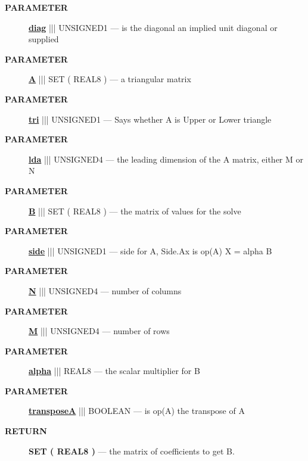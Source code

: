 \par
\begin{description}
\item [\colorbox{tagtype}{\color{white} \textbf{\textsf{PARAMETER}}}] \textbf{\underline{diag}} ||| UNSIGNED1 --- is the diagonal an implied unit diagonal or supplied
\item [\colorbox{tagtype}{\color{white} \textbf{\textsf{PARAMETER}}}] \textbf{\underline{A}} ||| SET ( REAL8 ) --- a triangular matrix
\item [\colorbox{tagtype}{\color{white} \textbf{\textsf{PARAMETER}}}] \textbf{\underline{tri}} ||| UNSIGNED1 --- Says whether A is Upper or Lower triangle
\item [\colorbox{tagtype}{\color{white} \textbf{\textsf{PARAMETER}}}] \textbf{\underline{lda}} ||| UNSIGNED4 --- the leading dimension of the A matrix, either M or N
\item [\colorbox{tagtype}{\color{white} \textbf{\textsf{PARAMETER}}}] \textbf{\underline{B}} ||| SET ( REAL8 ) --- the matrix of values for the solve
\item [\colorbox{tagtype}{\color{white} \textbf{\textsf{PARAMETER}}}] \textbf{\underline{side}} ||| UNSIGNED1 --- side for A, Side.Ax is op(A) X = alpha B
\item [\colorbox{tagtype}{\color{white} \textbf{\textsf{PARAMETER}}}] \textbf{\underline{N}} ||| UNSIGNED4 --- number of columns
\item [\colorbox{tagtype}{\color{white} \textbf{\textsf{PARAMETER}}}] \textbf{\underline{M}} ||| UNSIGNED4 --- number of rows
\item [\colorbox{tagtype}{\color{white} \textbf{\textsf{PARAMETER}}}] \textbf{\underline{alpha}} ||| REAL8 --- the scalar multiplier for B
\item [\colorbox{tagtype}{\color{white} \textbf{\textsf{PARAMETER}}}] \textbf{\underline{transposeA}} ||| BOOLEAN --- is op(A) the transpose of A
\end{description}







\par
\begin{description}
\item [\colorbox{tagtype}{\color{white} \textbf{\textsf{RETURN}}}] \textbf{SET ( REAL8 )} --- the matrix of coefficients to get B.
\end{description}




